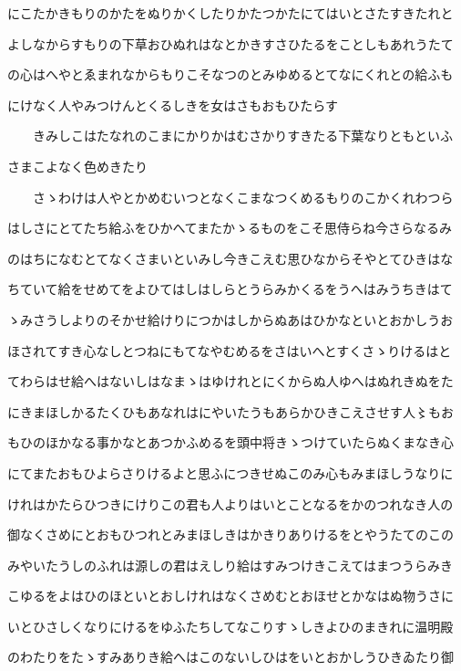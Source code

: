 \documentclass[a4paper,11pt,landscape]{ltjtarticle}
\begin{document}
\par\medskip
にこたかきもりのかたをぬりかくしたりかたつかたにてはいとさたすきたれと
\par\medskip
よしなからすもりの下草おひぬれはなとかきすさひたるをことしもあれうたて
\par\medskip
の心はへやとゑまれなからもりこそなつのとみゆめるとてなにくれとの給ふも
\par\medskip
にけなく人やみつけんとくるしきを女はさもおもひたらす
\par\medskip
　　きみしこはたなれのこまにかりかはむさかりすきたる下葉なりともといふ
\par\medskip
さまこよなく色めきたり
\par\medskip
　　さゝわけは人やとかめむいつとなくこまなつくめるもりのこかくれわつら
\par\medskip
はしさにとてたち給ふをひかへてまたかゝるものをこそ思侍らね今さらなるみ
\par\medskip
のはちになむとてなくさまいといみし今きこえむ思ひなからそやとてひきはな
\par\medskip
ちていて給をせめてをよひてはしはしらとうらみかくるをうへはみうちきはて
\par\medskip
ゝみさうしよりのそかせ給けりにつかはしからぬあはひかなといとおかしうお
\par\medskip
ほされてすき心なしとつねにもてなやむめるをさはいへとすくさゝりけるはと
\par\medskip
てわらはせ給へはないしはなまゝはゆけれとにくからぬ人ゆへはぬれきぬをた
\par\medskip
にきまほしかるたくひもあなれはにやいたうもあらかひきこえさせす人〻もお
\par\medskip
もひのほかなる事かなとあつかふめるを頭中将きゝつけていたらぬくまなき心
\par\medskip
にてまたおもひよらさりけるよと思ふにつきせぬこのみ心もみまほしうなりに
\par\medskip
けれはかたらひつきにけりこの君も人よりはいとことなるをかのつれなき人の
\par\medskip
御なくさめにとおもひつれとみまほしきはかきりありけるをとやうたてのこの
\par\medskip
みやいたうしのふれは源しの君はえしり給はすみつけきこえてはまつうらみき
\par\medskip
こゆるをよはひのほといとおしけれはなくさめむとおほせとかなはぬ物うさに
\par\medskip
いとひさしくなりにけるをゆふたちしてなこりすゝしきよひのまきれに温明殿
\par\medskip
のわたりをたゝすみありき給へはこのないしひはをいとおかしうひきゐたり御
\end{document}
